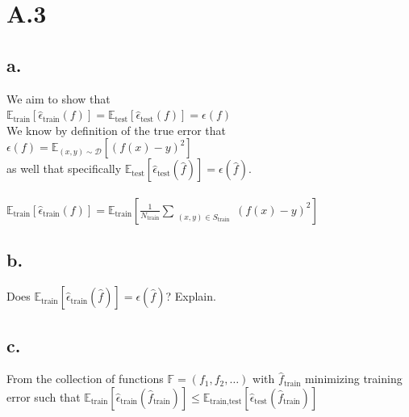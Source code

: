 \documentclass{article}
\newcommand{\field}[1]{\mathbb{#1}}
\newcommand{\1}{\mathbf{1}}
\newcommand{\E}{\mathbb{E}}
\newcommand{\F}{\field{F}} %
\begin{document}
\section*{A.3}
{\Large 

\subsection*{a.}

We aim to show that \\
$\E_{\text{train}}[\widehat{\epsilon}_{\text{train}}(f)] = \E_{\text{test}}[\widehat{\epsilon}_{\text{test}}(f)] = \epsilon(f)$ \\
We know by definition of the true error that $\epsilon(f) = \E_{(x,y) \sim \mathcal{D}}[(f(x) - y)^2]$ \\
as well that specifically $\E_{\text{test}}[\widehat{\epsilon}_{\text{test}}(\widehat{f})] = \epsilon(\widehat{f})$. \\ \\

$\E_{\text{train}}[\widehat{\epsilon}_{\text{train}}(f)] = \E_{\text{train}}[\frac{1}{N_{\text{train}}} \sum\limits_{\substack{(x,y) \in S_{\text{train}}}} (f(x) - y)^2]$ \\

\subsection*{b.}

Does $\E_{\text{train}}[\widehat{\epsilon}_{\text{train}}(\widehat{f})] = \epsilon(\widehat{f})$? Explain.

\subsection*{c.}
From the collection of functions $\F = (f_1, f_2, \dots)$ with $\widehat{f}_{\text{train}}$ minimizing training error such that $\E_{\text{train}}[\widehat{\epsilon}_{\text{train}}(\widehat{f}_{\text{train}})] \leq \E_{\text{train,test}}[\widehat{\epsilon}_{\text{test}}(\widehat{f}_{\text{train}})]$

}
\end{document}

